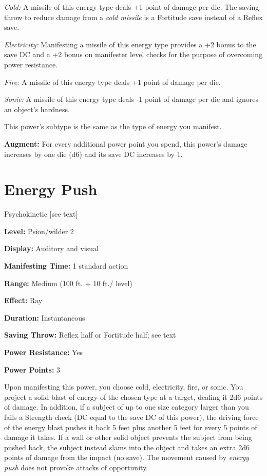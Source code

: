 \documentclass{article}
\begin{document}
\textit{Cold: }A missile of this energy type deals +1 point of damage per die. 
The saving throw to reduce damage from a \textit{cold missile }is a Fortitude save 
instead of a Reflex save.

\textit{Electricity: }Manifesting a missile of this energy type provides a +2 bonus 
to the save DC and a +2 bonus on manifester level checks for the purpose of overcoming 
power resistance.

\textit{Fire: }A missile of this energy type deals +1 point of damage per die.

\textit{Sonic: }A missile of this energy type deals -1 point of damage per die 
and ignores an object's hardness.

This power's subtype is the same as the type of energy you manifest.

\textbf{Augment:} For every additional power point you spend, this power's damage 
increases by one die (d6) and its save DC increases by 1.

\vspace{12pt}
\section*{Energy Push}

Psychokinetic [see text]

\textbf{Level:} Psion/wilder 2

\textbf{Display:} Auditory and visual

\textbf{Manifesting Time:} 1 standard action

\textbf{Range:} Medium (100 ft. + 10 ft./ level)

\textbf{Effect:} Ray

\textbf{Duration:} Instantaneous

\textbf{Saving Throw:} Reflex half or Fortitude half; see text

\textbf{Power Resistance:} Yes

\textbf{Power Points:} 3

Upon manifesting this power, you choose cold, electricity, fire, or sonic. You 
project a solid blast of energy of the chosen type at a target, dealing it 2d6 
points of damage. In addition, if a subject of up to one size category larger than 
you fails a Strength check (DC equal to the save DC of this power), the driving 
force of the energy blast pushes it back 5 feet plus another 5 feet for every 5 
points of damage it takes. If a wall or other solid object prevents the subject 
from being pushed back, the subject instead slams into the object and takes an 
extra 2d6 points of damage from the impact (no save). The movement caused by \textit{energy 
push }does not provoke attacks of opportunity.
\end{document}
